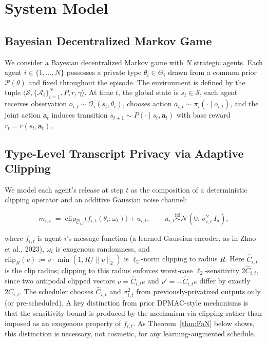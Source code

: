 \documentclass{article}
\begin{document}
\section{System Model}
\label{sec:system}
\subsection{Bayesian Decentralized Markov Game}

We consider a Bayesian decentralized Markov game with $N$ strategic agents. Each agent $i \in \{1,\dots,N\}$ possesses a private type $\theta_i \in \Theta_i$ drawn from a common prior $\mathcal{P}(\theta)$ and fixed throughout the episode. The environment is defined by the tuple $\langle \mathcal{S}, \{\mathcal{A}_i\}_{i=1}^N, P, r, \gamma \rangle$. At time $t$, the global state is $s_t \in \mathcal{S}$, each agent receives observation $o_{i,t} \sim \mathcal{O}_i(s_t,\theta_i)$, chooses action $a_{i,t} \sim \pi_i(\cdot \mid o_{i,t})$, and the joint action $\mathbf{a}_t$ induces transition $s_{t+1}\sim P(\cdot \mid s_t,\mathbf{a}_t)$ with base reward $r_t=r(s_t,\mathbf{a}_t)$.

\subsection{Type-Level Transcript Privacy via Adaptive Clipping}
\label{sec:adaptive}

We model each agent's release at step $t$ as the composition of a deterministic clipping operator and an additive Gaussian noise channel:

\begin{equation}
m_{i,t} \;=\; \mathrm{clip}_{\hat{C}_{i,t}}\!\big(f_{i,t}(\theta_i; \omega_t)\big) + u_{i,t}, \qquad u_{i,t} \stackrel{\mathrm{iid}}{\sim} \mathcal{N}(0,\,\sigma_{i,t}^2\, I_d),
\end{equation}

where $f_{i,t}$ is agent $i$'s message function (a learned Gaussian encoder, as in Zhao et al., 2023), $\omega_t$ is exogenous randomness, and $\mathrm{clip}_R(v) := v \cdot \min(1, R/\|v\|_2)$ is $\ell_2$-norm clipping to radius $R$. Here $\hat{C}_{i,t}$ is the clip radius; clipping to this radius enforces worst-case $\ell_2$-sensitivity $2\hat C_{i,t}$, since two antipodal clipped vectors $v = \hat C_{i,t} e$ and $v' = -\hat C_{i,t} e$ differ by exactly $2\hat C_{i,t}$. The scheduler chooses $\hat{C}_{i,t}$ and $\sigma_{i,t}^2$ from previously-privatized outputs only (or pre-scheduled). A key distinction from prior DPMAC-style mechanisms is that the sensitivity bound is produced by the mechanism via clipping rather than imposed as an exogenous property of $f_{i,t}$. As Theorem~\ref{thm:FoN} below shows, this distinction is necessary, not cosmetic, for any learning-augmented schedule.
\end{document}
